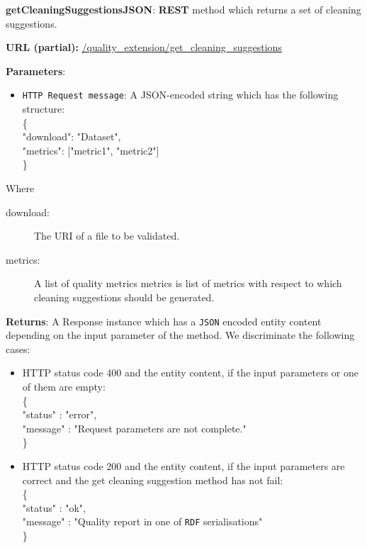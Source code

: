 \begin{description}

\item{\textbf{getCleaningSuggestionsJSON}:} \textbf{REST} method which returns a set of cleaning suggestions.

\textbf{URL (partial):} \url{/quality_extension/get_cleaning_suggestions} 

\textbf{Parameters}: 
\begin{itemize}
\item \texttt{HTTP Request message}: A JSON-encoded string which has the following structure: \\
\hspace*{0.2 cm}\{\\
\hspace*{0.5 cm}"download": "Dataset", \\
\hspace*{0.5 cm}"metrics": ["metric1", "metric2"]  \\
\hspace*{0.2 cm}\} \\
\end{itemize}
Where
\begin{description}
\item[download:] The URI of a file to be validated. 
\item[metrics:] A list of quality metrics metrics is list of metrics with respect to which cleaning suggestions should be generated. 
\end{description}


\textbf{Returns}: A Response instance which has a \texttt{JSON} encoded entity content depending on the input parameter of the method. We discriminate the following cases: 
\begin{itemize}
\item  HTTP status code 400 and the entity content, if the input parameters or one of them are empty:\\ \hspace*{0.2 cm}\{\\
\hspace*{0.5 cm} "status" : "error",\\
\hspace*{0.5 cm} "message" : "Request parameters are not complete."\\ \hspace*{0.2 cm} \}

\item  HTTP status code 200 and the entity content, if the input parameters are correct and the get cleaning suggestion method has not fail:\\ \hspace*{0.2 cm} \{\\
 \hspace*{0.5 cm}"status" : "ok",\\ 
 \hspace*{0.5 cm}  "message" : "Quality report in one of \texttt{RDF} serialisations" \\ \hspace*{0.2 cm} \}


\end{itemize}
\end{description}

